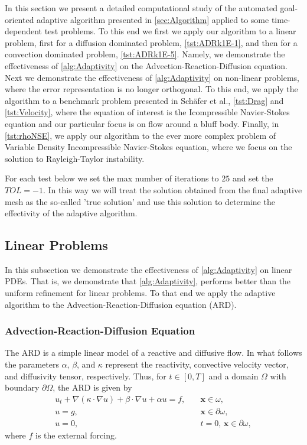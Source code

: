 In this section we present a detailed computational study of the automated
goal-oriented adaptive algorithm presented in \autoref{sec:Algorithm} applied to
some time-dependent test problems. To this end we first we apply our algorithm
to a linear problem, first for a diffusion dominated problem,
\autoref{tst:ADRk1E-1}, and then for a convection dominated problem,
\autoref{tst:ADRk1E-5}.  Namely, we demonstrate the effectiveness of
\autoref{alg:Adaptivity} on the Advection-Reaction-Diffusion equation. Next we
demonstrate the effectiveness of \autoref{alg:Adaptivity} on non-linear
problems, where the error representation is no longer orthogonal. To this end,
we apply the algorithm to a benchmark problem presented in Sch\"afer et
al.\cite{Schaefer1996}, \autoref{tst:Drag} and \autoref{tst:Velocity}, where the
equation of interest is the Icompressible Navier-Stokes equation and our
particular focus is on flow around a bluff body.  Finally, in
\autoref{tst:rhoNSE}, we apply our algorithm to the ever more complex problem of
Variable Density Incompressible Navier-Stokes equation, where we focus on the
solution to Rayleigh-Taylor instability.

For each test below we set the max number of iterations to $25$ and set the
$TOL=-1$. In this way we will treat the solution obtained from the final
adaptive mesh as the so-called 'true solution' and use this solution to
determine the effectivity of the adaptive algorithm.

\subsection{Linear Problems}
    In this subsection we demonstrate the effectiveness of
    \autoref{alg:Adaptivity} on linear PDEs. That is, we demonstrate that
    \autoref{alg:Adaptivity}, performs better than the uniform refinement for
    linear problems. To that end we apply the adaptive algorithm to
    the Advection-Reaction-Diffusion equation (ARD).

\subsubsection{Advection-Reaction-Diffusion Equation} \label{sss:ADR}
    The ARD is a simple linear model of a reactive and diffusive flow.  In what
    follows the parameters $\alpha,\,\beta$, and $\kappa$ represent the
    reactivity, convective velocity vector, and diffusivity tensor,
    respectively. Thus, for $t\in [0,T]$ and a domain $\Omega$ with boundary
    $\partial \Omega$, the ARD is given by
    \begin{equation}
        \begin{split}
            u_t + \nabla \left(\kappa\cdot \nabla u \right) + \beta \cdot \nabla
                u + \alpha u = f,& \quad \mathbf{x} \in \omega, \\
            u = g,& \quad \mathbf{x} \in \partial \omega, \\
            u = 0,& \quad t = 0,\, \mathbf{x} \in \partial \omega,
        \end{split}
        \label{eq:ADR}
    \end{equation}
    where $f$ is the external forcing.


